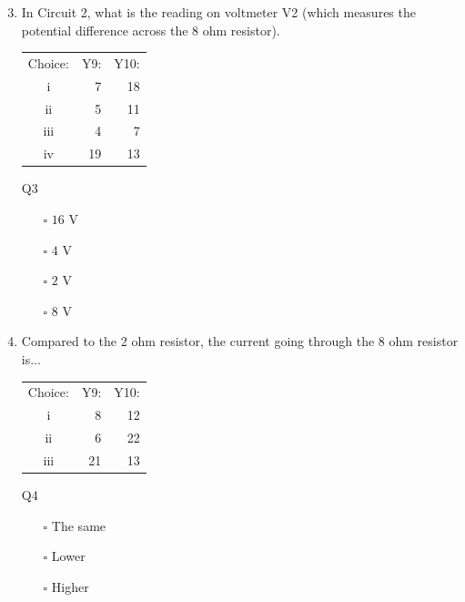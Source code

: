 \documentclass[a4paper,openany,nobib]{tufte-book}
\begin{document}
\begin{enumerate}
	\setcounter{enumi}{2}
	\item In Circuit 2, what is the reading on voltmeter V2 (which measures the potential difference across the 8 ohm resistor). 
		\begin{margintable}
		\begin{center}
		\begin{tabular}{crr}
		\toprule
		 Choice: & Y9: & Y10:\\
		 i & 7 & 18\\
		 ii & 5 & 11\\
		 iii & 4 & 7\\
		 iv & 19 & 13\\
		 \bottomrule
		\end{tabular}
		\caption{\centering Q3}
		\end{center}
		\end{margintable}
		\begin{itemize}
			\item[$\square$]$16$ V
			\item[$\square$]$4$ V
			\item[$\square$]$2$ V
			\item[$\square$]$8$ V
		\end{itemize}
	\item Compared to the 2 ohm resistor, the current going through the 8 ohm resistor is...
		\begin{margintable}[1cm]
		\begin{center}
		\begin{tabular}{crr}
		\toprule
		 Choice: & Y9: & Y10:\\
		 i & 8 & 12\\
		 ii & 6 & 22\\
		 iii & 21 & 13\\
		 \bottomrule
		\end{tabular}
		\caption{\centering Q4}
		\end{center}
		\end{margintable}
	\begin{itemize}
		\item[$\square$] The same
		\item[$\square$] Lower
		\item[$\square$] Higher
	\end{itemize}
\end{enumerate}
\end{document}
